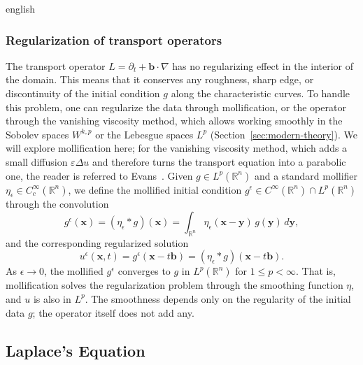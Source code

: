 \begin{hyphenrules}{english}
\subsubsection{Regularization of transport operators}
The transport operator $L=\partial_t+\mathbf{b}\cdot\nabla$ has no regularizing effect in the interior of the
domain. This means that it conserves any roughness, sharp edge, or discontinuity of the initial
condition $g$ along the characteristic curves. To handle this problem, one can regularize the data
through mollification, or the operator through the vanishing viscosity method, which allows working
smoothly in the Sobolev spaces $W^{k,p}$ or the Lebesgue spaces $L^p$ (Section~\ref{sec:modern-theory}). We
will explore mollification here; for the vanishing viscosity method, which adds a small diffusion
$\varepsilon\Delta u$ and therefore turns the transport equation into a parabolic one, the reader is
referred to Evans~\cite{evans2010}. Given $g\in L^p(\mathbb{R}^n)$ and a standard mollifier
$\eta_\epsilon\in C_c^\infty(\mathbb{R}^n)$, we define the mollified initial condition
$g^\epsilon\in C^\infty(\mathbb{R}^n)\cap L^p(\mathbb{R}^n)$ through the convolution
\begin{equation}
  g^{\epsilon}(\mathbf{x})=(\eta_\epsilon*g)(\mathbf{x})=\int_{\mathbb{R}^n}\eta_\epsilon(\mathbf{x}-\mathbf{y})\,g(\mathbf{y})\,d\mathbf{y},
  \label{eq:mollifier}
\end{equation}
and the corresponding regularized solution
\begin{equation}
  u^{\epsilon}(\mathbf{x},t)=g^{\epsilon}(\mathbf{x}-t\mathbf{b})=(\eta_\epsilon*g)(\mathbf{x}-t\mathbf{b}).
  \label{eq:transport-mollified}
\end{equation}
As $\epsilon\to0$, the mollified $g^\epsilon$ converges to $g$ in $L^p(\mathbb{R}^n)$ for $1\le p<\infty$. That
is, mollification solves the regularization problem through the smoothing function $\eta$, and $u$ is also in $L^p$. The
smoothness depends only on the regularity of the initial data $g$; the operator itself does not add any.
\subsection{Laplace's Equation}\label{subsec:laplace}


\end{hyphenrules}
